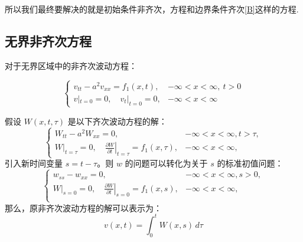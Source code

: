 \documentclass[12pt,a4paper]{article}
\numberwithin{subsection}{section}   %
\numberwithin{subsubsection}{subsection}
\theoremstyle{plain}
\theoremstyle{definition}
\theoremstyle{remark}
\theoremstyle{remark}
\begin{document}
所以我们最终要解决的就是初始条件非齐次，方程和边界条件齐次\eqref{B}这样的方程.
	
	
	

	\subsection{无界非齐次方程}
	对于无界区域中的非齐次波动方程：
	
\begin{equation}
	\begin{cases}
		v_{tt} - a^2 v_{xx} = f_1(x, t), & -\infty < x < \infty, \ t > 0 \\
		v|_{t=0} = 0, \quad v_t|_{t=0} = 0, & -\infty < x < \infty
	\end{cases}
\end{equation}
	
	假设 \(W(x, t, \tau)\) 是以下齐次波动方程的解：
	\begin{equation}
		\begin{cases}
			W_{tt} - a^2 W_{xx} = 0, &-\infty < x < \infty, t > \tau, \\
			W|_{t=\tau} = 0, \quad \left. \frac{\partial W}{\partial t} \right|_{t=\tau} = f_1(x, \tau), & -\infty < x < \infty,
		\end{cases}
	\end{equation}
	引入新时间变量 $s = t-\tau$。则 $w$ 的问题可以转化为关于 $s$ 的标准初值问题：
\begin{equation}
	\begin{cases}
		w_{ss} - w_{xx} = 0, &-\infty < x < \infty,s > 0, \\
		W|_{s=0} = 0, \quad \left. \frac{\partial W}{\partial t} \right|_{s=0} = f_1(x, s), & -\infty < x < \infty,\\
		
	\end{cases}
\end{equation}	
	那么，原非齐次波动方程的解可以表示为：
\begin{equation}
	 v(x, t) = \int_0^t W(x, s) \, d\tau
\end{equation}
\end{document}
